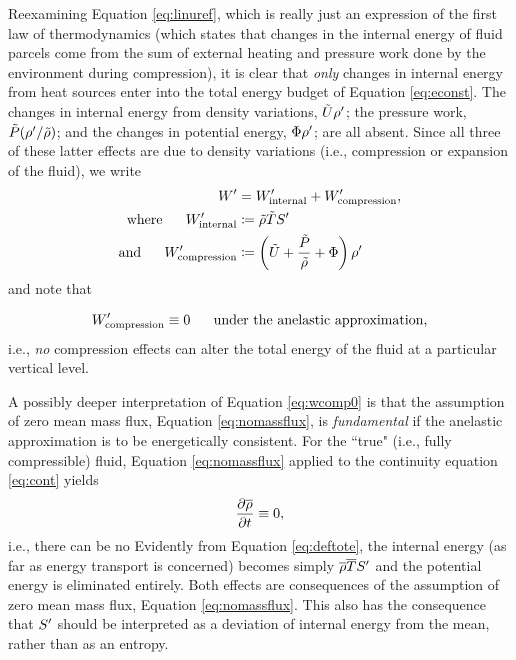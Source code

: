 \documentclass[12pt]{article}
\newcommand{\wint}{W^\prime_{\rm internal}}
\newcommand{\wcomp}{W^\prime_{\rm compression}}
\begin{document}
Reexamining Equation \eqref{eq:linuref}, which is really just an expression of the first law of thermodynamics (which states that changes in the internal energy of fluid parcels come from the sum of external heating and pressure work done by the environment during compression), it is clear that \textit{only} changes in internal energy from heat sources enter into the total energy budget of Equation \eqref{eq:econst}. The changes in internal energy from density variations, $\tilde{U}\rho^\prime$; the pressure work, $\tilde{P}(\rho^\prime/\tilde{\rho})$; and the changes in potential energy, $\Phi\rho^\prime$; are all absent. Since all three of these latter effects are due to density variations (i.e., compression or expansion of the fluid), we write
\begin{subequations}\label{eq:perten2}
	\begin{align}
		W^\prime &= \wint + \wcomp,\\
		\where \wint&\define \rhotilde\tmptilde \entrprime\\
		\andd \wcomp &\define \left(\intetilde+\frac{\prstilde}{\rhotilde}+\Phi\right)\rhoprime
	\end{align}
\end{subequations}
and note that 

\begin{align}\label{eq:wcomp0}
	\wcomp\equiv0\five\text{under the anelastic approximation},
\end{align}
i.e., \textit{no} compression effects can alter the total energy of the fluid at a particular vertical level.

A possibly deeper interpretation of Equation \eqref{eq:wcomp0} is that the assumption of zero mean mass flux, Equation \eqref{eq:nomassflux}, is \textit{fundamental} if the anelastic approximation is to be energetically consistent. For the ``true" (i.e., fully compressible) fluid, Equation \eqref{eq:nomassflux} applied to the continuity equation \eqref{eq:cont} yields
\begin{align}
	\frac{\partial\overline{\rho}}{\partial t}\equiv0,
\end{align}
i.e., there can be no
Evidently from Equation \eqref{eq:deftote}, the internal energy (as far as energy transport is concerned) becomes simply $\overline{\rho}\overline{T} S^\prime$ and the potential energy is eliminated entirely. Both effects are consequences of the assumption of zero mean mass flux, Equation \eqref{eq:nomassflux}. This also has the consequence that $S^\prime$ should be interpreted as a deviation of internal energy from the mean, rather than as an entropy. 
\end{document}
